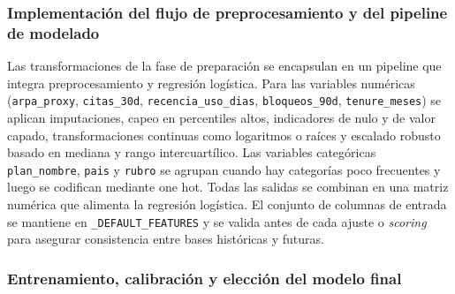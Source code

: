 \subsubsection{Implementación del flujo de preprocesamiento y del pipeline de modelado}

Las transformaciones de la fase de preparación se encapsulan en un pipeline que integra preprocesamiento y regresión logística. Para las variables numéricas (\texttt{arpa\_\hspace{0pt}proxy}, \texttt{citas\_\hspace{0pt}30d}, \texttt{recencia\_\hspace{0pt}uso\_\hspace{0pt}dias}, \texttt{bloqueos\_\hspace{0pt}90d}, \texttt{tenure\_\hspace{0pt}meses}) se aplican imputaciones, capeo en percentiles altos, indicadores de nulo y de valor capado, transformaciones continuas como logaritmos o raíces y escalado robusto basado en mediana y rango intercuartílico. Las variables categóricas \texttt{plan\_\hspace{0pt}nombre}, \texttt{pais} y \texttt{rubro} se agrupan cuando hay categorías poco frecuentes y luego se codifican mediante one hot. Todas las salidas se combinan en una matriz numérica que alimenta la regresión logística. El conjunto de columnas de entrada se mantiene en \texttt{\_DEFAULT\_\hspace{0pt}FEATURES} y se valida antes de cada ajuste o \textit{scoring} para asegurar consistencia entre bases históricas y futuras.

\subsubsection{Entrenamiento, calibración y elección del modelo final}

